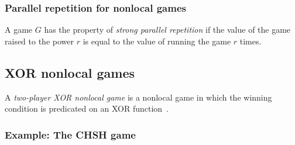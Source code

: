 \documentclass[nofootinbib,superscriptaddress,a4paper,twocolumn,longbibliography,floatfix,pra]{revtex4-2}
\begin{document}
\subsubsection{Parallel repetition for nonlocal games}
\label{sec:parallel_repeptitionfor_nonlocal_games}

A game $G$ has the property of \emph{strong parallel repetition} if the value
of the game raised to the power $r$ is equal to the value of running the game
$r$ times.

\subsection{XOR nonlocal games}
\label{sec:xor_nonlocal_games}

A \emph{two-player XOR nonlocal game} is a nonlocal game in which the winning
condition is predicated on an XOR function~\cite{cleve2004consequences}.

\subsubsection{Example: The CHSH game}
\label{sec:chsh_game}
\end{document}
